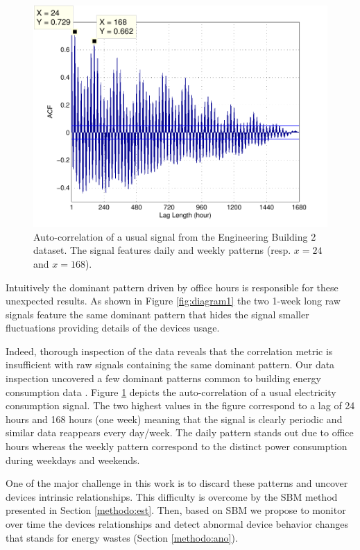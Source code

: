 \begin{figure}[t!]
\begin{center}
\includegraphics[width=.45\textwidth]{img/acf_101A1_GHP-eps-converted-to.pdf}
\caption{Auto-correlation of a usual signal from the Engineering Building 2 dataset.
The signal features daily and weekly patterns (resp. $x=24$ and $x=168$).}
\label{fig:autocorr}
\end{center}
\end{figure}

Intuitively the dominant pattern driven by office hours is responsible for these unexpected results.
As shown in Figure \ref{fig:diagram1} the two 1-week long raw signals feature the same dominant pattern that hides the signal smaller fluctuations providing details of the devices usage.

Indeed, thorough inspection of the data reveals that the correlation metric is insufficient with raw signals containing the same dominant pattern.
Our data inspection uncovered a few dominant patterns common to building energy consumption data \cite{wrinch:pes2012}.
Figure \ref{fig:autocorr} depicts the auto-correlation of a usual electricity consumption signal.
The two highest values in the figure correspond to a lag of 24 hours and 168 hours (one week) meaning that the signal is clearly periodic and similar data reappears every day/week.
The daily pattern stands out due to office hours whereas the weekly pattern correspond to the distinct power consumption during weekdays and weekends.

One of the major challenge in this work is to discard these patterns and uncover devices intrinsic relationships.
This difficulty is overcome by the SBM method presented in Section \ref{methodo:est}.
Then, based on SBM we propose to monitor over time the devices relationships and detect abnormal device behavior changes that stands for energy wastes (Section \ref{methodo:ano}).

